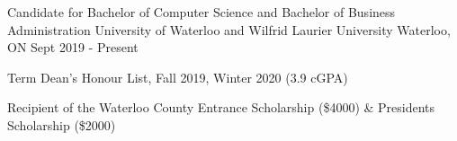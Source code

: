 
\begin{cventries}
  \cventry
    {Candidate for Bachelor of Computer Science and Bachelor of Business Administration} %
    {University of Waterloo and Wilfrid Laurier University} %
    {Waterloo, ON} %
    {Sept 2019 - Present} %
    {
      \begin{cvitems} %
         \item {Term Dean's Honour List, Fall 2019, Winter 2020 (3.9 cGPA)}
         \vspace{0.5mm}
         \item {Recipient of the Waterloo County Entrance Scholarship (\$4000) \& President\textquotesingle s Scholarship (\$2000)}
      \end{cvitems}
    }
\end{cventries}
